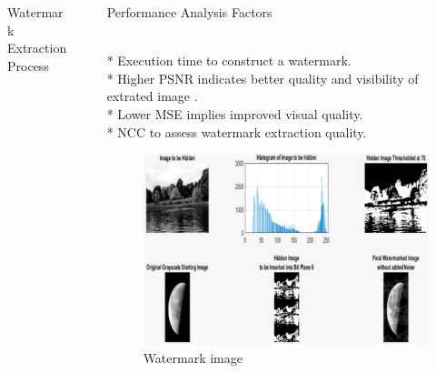 \documentclass[final]{beamer}
\newlength{\sepwidth}
\newlength{\colwidth}
\newcommand{\separatorcolumn}{\begin{column}{\sepwidth}\end{column}}
\begin{document}
\begin{frame}[t]
\begin{columns}[t]
\begin{column}{\colwidth}
\begin{block}{Watermark Extraction Process}
\end{block}

\end{column}

\separatorcolumn

\begin{column}{\colwidth}

 \begin{block}{Performance Analysis Factors}
 
\\ * Execution time to construct a watermark.
\\ * Higher PSNR indicates better quality and visibility of extrated image .
\\ * Lower MSE implies improved visual quality.
\\ * NCC to assess watermark extraction quality.

 \end{block}

\lipsum
\begin{figure}
    \centering
    \includegraphics[width=1.0\textwidth]{images and logos/watermark image.pdf}
    \caption{Watermark image}
    \label{fig:img1}
\end{figure}
\lipsum


\end{column}
\end{columns}
\end{frame}
\end{document}
